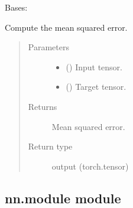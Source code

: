 \documentclass[letterpaper,10pt,english]{sphinxmanual}
\begin{document}

\begin{fulllineitems}
\label{\detokenize{nn:nn.loss.MSELoss}}
Bases: {\hyperref[\detokenize{nn:nn.loss.Loss}]{}}

\begin{fulllineitems}
\label{\detokenize{nn:nn.loss.MSELoss.forward}}
Compute the mean squared error.
\begin{quote}\begin{description}
\item[{Parameters}] \leavevmode\begin{itemize}
\item {} 
 () \textendash{} Input tensor.

\item {} 
 () \textendash{} Target tensor.

\end{itemize}

\item[{Returns}] \leavevmode
Mean squared error.

\item[{Return type}] \leavevmode
output (torch.tensor)

\end{description}\end{quote}

\end{fulllineitems}


\end{fulllineitems}



\subsection{nn.module module}
\label{\detokenize{nn:module-nn.module}}\label{\detokenize{nn:nn-module-module}}
\end{document}
